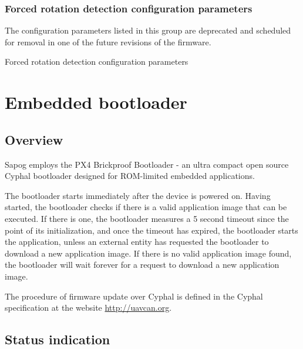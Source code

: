 \documentclass{zubaxdoc}
\begin{document}
\subsection{Forced rotation detection configuration parameters}

The configuration parameters listed in this group are deprecated and scheduled for removal in one
of the future revisions of the firmware.

\begin{CfgParamIndex}{Forced rotation detection configuration parameters}
\end{CfgParamIndex}

\chapter{Embedded bootloader}\label{sec:bootloader}

\section{Overview}

Sapog employs the PX4 Brickproof Bootloader - an ultra compact open source Cyphal bootloader
designed for ROM-limited embedded applications.

The bootloader starts immediately after the device is powered on.
Having started, the bootloader checks if there is a valid application image that can be executed.
If there is one, the bootloader measures a 5 second timeout since the point of its initialization,
and once the timeout has expired, the bootloader starts the application, unless an external
entity has requested the bootloader to download a new application image.
If there is no valid application image found, the bootloader will wait forever for a request
to download a new application image.

The procedure of firmware update over Cyphal is defined in the Cyphal specification at the website
\url{http://uavcan.org}.

\section{Status indication}
\end{document}
